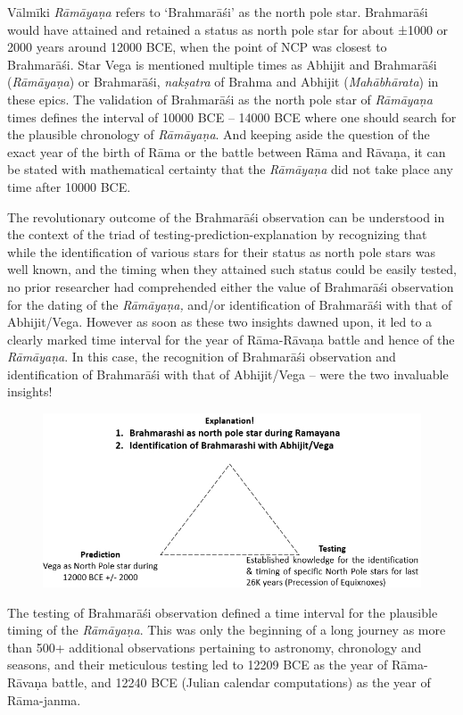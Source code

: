 Vālmīki \textit{Rāmāyaṇa} refers to ‘Brahmarāśi’ as the north pole star. Brahmarāśi would have attained and retained a status as north pole star for about ±1000 or 2000 years around 12000 BCE, when the point of NCP was closest to Brahmarāśi. Star Vega is mentioned multiple times as Abhijit and Brahmarāśi (\textit{Rāmāyaṇa}) or Brahmarāśi, \textit{nakṣatra} of Brahma and Abhijit (\textit{Mahābhārata}) in these epics. The validation of Brahmarāśi as the north pole star of \textit{Rāmāyaṇa} times defines the interval of 10000 BCE – 14000 BCE where one should search for the plausible chronology of \textit{Rāmāyaṇa}. And keeping aside the question of the exact year of the birth of Rāma or the battle between Rāma and Rāvaṇa, it can be stated with mathematical certainty that the \textit{Rāmāyaṇa} did not take place any time after 10000 BCE.

The revolutionary outcome of the Brahmarāśi observation can be understood in the context of the triad of testing-prediction-explanation by recognizing that while the identification of various stars for their status as north pole stars was well known, and the timing when they attained such status could be easily tested, no prior researcher had comprehended either the value of Brahmarāśi observation for the dating of the \textit{Rāmāyaṇa,} and/or identification of Brahmarāśi with that of Abhijit/Vega. However as soon as these two insights dawned upon, it led to a clearly marked time interval for the year of Rāma-Rāvaṇa battle and hence of the \textit{Rāmāyaṇa}. In this case, the recognition of Brahmarāśi observation and identification of Brahmarāśi with that of Abhijit/Vega – were the two invaluable insights!

\begin{figure}[!h]
\includegraphics[scale=.4]{images/chap2-11.jpg}
\end{figure}

The testing of Brahmarāśi observation defined a time interval for the plausible timing of the \textit{Rāmāyaṇa}. This was only the beginning of a long journey as more than 500+ additional observations pertaining to astronomy, chronology and seasons, and their meticulous testing led to 12209 BCE as the year of Rāma-Rāvaṇa battle, and 12240 BCE (Julian calendar computations) as the year of Rāma-janma.


